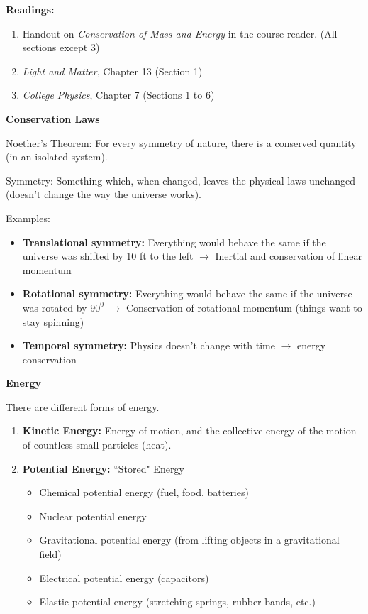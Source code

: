 \documentclass[12pt]{article}
\begin{document}
\noindent \textbf{Readings:}
\begin{enumerate}
\item Handout on \textit{Conservation of Mass and Energy} in the course reader. (All sections except 3)
\item \textit{Light and Matter}, Chapter 13 (Section 1)
\item \textit{College Physics}, Chapter 7 (Sections 1 to 6)
\end{enumerate}

\noindent\textbf{\large Conservation Laws}

Noether's Theorem: For every symmetry of nature, there is a conserved quantity (in an isolated system).

Symmetry: Something which, when changed, leaves the physical laws unchanged (doesn't change the way the universe works).

Examples:
\begin{itemize}
	\item \textbf{Translational symmetry:} Everything would behave the same if the universe was shifted by 10 ft to the left $\rightarrow$ Inertial and conservation of linear momentum
	\item \textbf{Rotational symmetry:} Everything would behave the same if the universe was rotated by $90^0$ $\rightarrow$ Conservation of rotational momentum (things want to stay spinning)
	\item \textbf{Temporal symmetry:} Physics doesn't change with time $\rightarrow$ energy conservation
\end{itemize}

\noindent\textbf{\large Energy}

There are different forms of energy.
\begin{enumerate}
	\item \textbf{Kinetic Energy:} Energy of motion, and the collective energy of the motion of countless small particles (heat).
	\item \textbf{Potential Energy:} ``Stored" Energy
	\begin{itemize}
		\item Chemical potential energy (fuel, food, batteries)
		\item Nuclear potential energy
		\item Gravitational potential energy (from lifting objects in a gravitational field)
		\item Electrical potential energy (capacitors)
		\item Elastic potential energy (stretching springs, rubber bands, etc.)
	\end{itemize}
\end{enumerate}
\end{document}
